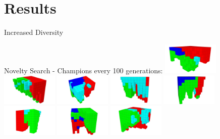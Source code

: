 \documentclass[6pt]{beamer}
\begin{document}
\section{Results}

{

\begin{frame}{Increased Diversity}
\begin{block}{Novelty Search - Champions every 100 generations:}
\includegraphics[width=0.2\textwidth]{../Figures/Robots/n_4_g_100.jpg}
\includegraphics[width=0.2\textwidth]{../Figures/Robots/n_4_g_200.jpg}
\includegraphics[width=0.2\textwidth]{../Figures/Robots/n_4_g_300.jpg}
\includegraphics[width=0.2\textwidth]{../Figures/Robots/n_4_g_400.jpg}
\includegraphics[width=0.2\textwidth]{../Figures/Robots/n_4_g_500.jpg}\\
\includegraphics[width=0.2\textwidth]{../Figures/Robots/n_4_g_600.jpg}
\includegraphics[width=0.2\textwidth]{../Figures/Robots/n_4_g_700.jpg}
\includegraphics[width=0.2\textwidth]{../Figures/Robots/n_4_g_800.jpg}

\end{block}
\end{frame}}
\end{document}
